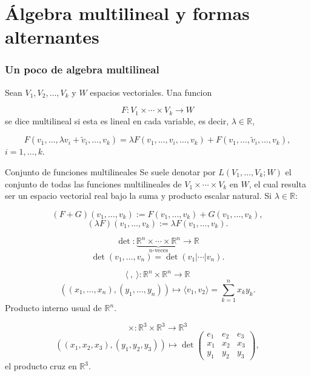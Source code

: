 \chapter{Álgebra multilineal y formas alternantes}
\label{ch:teo-20}
\subsection{Un poco de algebra multilineal}
\begin{bookdefinition}{}
Sean $V_1,V_2,\ldots,V_k$ y $W$ espacios vectoriales. Una funcion

\[
F:V_1\times\cdots\times V_k\to W
\]
se dice multilineal si esta es lineal en cada variable, es decir, $\lambda\in\mathbb R$,

\[
F(v_1,\ldots,\lambda v_i+\tilde v_i,\ldots,v_k) = \lambda F(v_1,\ldots,v_i,\ldots,v_k)+F(v_1,\ldots,\tilde v_i,\ldots,v_k),
\]
$i=1,\ldots,k$.

\end{bookdefinition}
\label{blk:2f1d75}
\begin{bookdefinition}{Conjunto de funciones multilineales}
Se suele denotar por $L(V_1,\ldots,V_k;W)$ el conjunto de todas las funciones multilineales de $V_1\times\cdots\times V_k$ en $W$, el cual resulta ser un espacio vectorial real bajo la suma y producto escalar natural. Si $\lambda\in\mathbb R$:

\[
(F+G)(v_1,\ldots,v_k):=F(v_1,\ldots,v_k)+G(v_1,\ldots,v_k),
\]
\[
(\lambda F)(v_1,\ldots,v_k):=\lambda F(v_1,\ldots,v_k).
\]
\end{bookdefinition}
\begin{bookexample}{}
\[
\det:\underbrace{\mathbb R^n\times\cdots\times\mathbb R^n}_{n\text{-veces}}\to\mathbb R
\]
\[
\det(v_1,\ldots,v_n)=\det(v_1|\cdots|v_n).
\]
\end{bookexample}
\begin{bookexample}{}
\[
\langle\ ,\ \rangle:\mathbb R^n\times\mathbb R^n\to\mathbb R
\]
\[
((x_1,\ldots,x_n),(y_1,\ldots,y_n))\mapsto \langle v_1,v_2\rangle=\sum_{k=1}^n x_k y_k.
\]
Producto interno usual de $\mathbb R^n$.

\end{bookexample}
\begin{bookexample}{}
\[
\times:\mathbb R^3\times\mathbb R^3\to\mathbb R^3
\]
\[
((x_1,x_2,x_3),(y_1,y_2,y_3)) \mapsto \det\begin{pmatrix} e_1&e_2&e_3\\ x_1&x_2&x_3\\ y_1&y_2&y_3 \end{pmatrix},
\]
el producto cruz en $\mathbb R^3$.

\end{bookexample}
